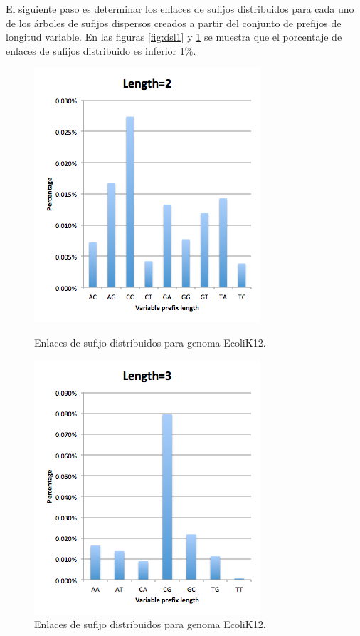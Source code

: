 \documentclass[12pt,a4paper]{article}
\begin{document}
El siguiente paso es determinar los enlaces de sufijos distribuidos para cada uno de los árboles de sufijos dispersos creados a partir del conjunto de prefijos de longitud variable. En las figuras \ref{fig:dsl1} y \ref{fig:dsl2} se muestra que el porcentaje de enlaces de sufijos distribuido es inferior 1\%.\\
\begin{figure}[!ht]
\begin{minipage}[b]{0.5\linewidth}
\centering
\includegraphics[scale=0.4]{dsl1.png}
\caption{Enlaces de sufijo distribuidos para genoma EcoliK12.}
\label{fig:dsl1}
\end{minipage}
\begin{minipage}[b]{0.5\linewidth}
\centering
\includegraphics[scale=0.4]{dsl2.png}
\caption{Enlaces de sufijo distribuidos para genoma EcoliK12.}
\label{fig:dsl2}
\end{minipage}
\end{figure}
\end{document}
